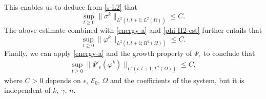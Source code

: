 \documentclass[11pt,reqno]{amsart}
\begin{document}
This enables us to deduce from \eqref{s-L2} that
%
\begin{equation}
\label{s-L2-est}
\sup_{t\geq 0}\| \sigma^k \|_{L^2(t,t+1; L^2(\Omega))} \leq C.
\end{equation}
%
The above estimate combined with \eqref{energy-a} and \eqref{phi-H2-est} further entails that
%
\begin{equation}
\label{phi-h-2}
\sup_{t\geq 0}\| \varphi^k\|_{L^2(t,t+1; H^2(\Omega))}
\leq C.
\end{equation}
%
Finally, we can apply \eqref{energy-a} and the growth property of $\Psi_{\epsilon}$ to conclude that
%
\begin{align}
	\sup_{t\geq 0}\|\Psi'_{\epsilon}(\varphi^k)\|_{L^2(t,t+1;L^2(\Omega))}\leq C,
	\label{Psip0b}
\end{align}
%
where $C>0$ depends on $\epsilon$, $\mathcal{E}_0$, $\Omega$ and the coefficients of the system, but it is independent of $k$, $\gamma$, $n$.

\medskip
\end{document}
